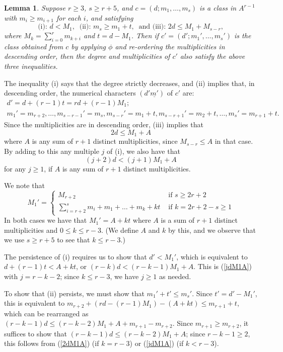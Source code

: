\documentclass[12pt]{article}
\numberwithin{equation}{section}
\newtheorem{lemma}[equation]{Lemma}
\numberwithin{equation}{section}
\numberwithin{subeq}{equation}
\begin{document}
\begin{lemma}
Suppose $r\geq 3$, $s \geq r+5$, and $c = (d;m_1,\ldots,m_s)$ is a class in $A^{r-1}$
with $m_i \geq m_{i+1}$ for each $i$, and satisfying
\[
\text{(i): }d < M_1, \;\; \text{(ii): }m_s \geq m_1+t, \;\;\text{and (iii): } 2d \leq M_1+M_{s-r},
\]
where $M_k = \sum_{i=0}^{r} m_{k+i}$ and $t=d-M_1$.
Then if $c'=(d';m_1',\ldots,m_s')$ is the class obtained from $c$ 
by applying $\phi$ and re-ordering the multiplicities in descending order,
then the degree and multiplicities of $c'$ also satisfy the above three inequalities.
\end{lemma}

\medskip{}
The inequality (i) says that the degree strictly decreases,
and (ii) implies that, in descending order, the numerical characters $(d'\underline{m'})$ of $c'$ are:
\begin{gather*}
d'=d+(r-1)t=rd+(r-1)M_1;\\
m_1'=m_{r+2},\ldots,m_{s-r-1}'=m_s,m_{s-r}'=m_1+t, m_{s-r+1}'=m_2+t,\ldots,m_s'=m_{r+1}+t.
\end{gather*}
Since the multiplicities are in descending order, (iii) implies that
\begin{equation}\label{2dM1A}
2d \leq M_1 + A
\end{equation}
where $A$ is any sum of $r+1$ distinct multiplicities,
since $M_{s-r}\leq A$ in that case.
By adding to this any multiple $j$ of (i), we also have that
\begin{equation}\label{jdM1A}
(j+2)d < (j+1)M_1+A
\end{equation}
for any $j \geq 1$, if $A$ is any sum of $r+1$ distinct multiplicities.

We note that 
\[
M_1' = \begin{cases} M_{r+2} & \text{ if } s \geq 2r+2 \\
\sum_{i=r+2}^s m_i + m_1+\ldots+m_k  + kt & \text{ if } k=2r+2-s \geq 1
\end{cases}
\]
In both cases we have that $M_1'=A+kt$ where
$A$ is a sum of $r+1$ distinct multiplicities and $0 \leq k \leq r-3$.
(We define $A$ and $k$ by this,
and we observe that we use $s \geq r+5$ to see that $k \leq r-3$.)


The persistence of (i) requires us to show that $d'<M_1'$,
which is equivalent to $d+(r-1)t < A+kt$, or $(r-k)d< (r-k-1)M_1+A$.
This is (\ref{jdM1A}) with $j=r-k-2$; since $k \leq r-3$, we have $j\geq 1$ as needed.

To show that (ii) persists, we must show that $m_1'+t' \leq m_s'$.
Since $t'=d'-M_1'$, this is equivalent to
$m_{r+2}+(rd-(r-1)M_1)-(A+kt) \leq m_{r+1}+t$, which can be rearranged as
$(r-k-1)d \leq (r-k-2)M_1 +A+ m_{r+1}-m_{r+2}$.
Since $m_{r+1} \geq m_{r+2}$,
it suffices to show that $(r-k-1)d \leq (r-k-2)M_1 +A$;
since $r-k-1 \geq 2$, this follows from (\ref{2dM1A}) (if $k=r-3$) or (\ref{jdM1A}) (if $k < r-3$).
\end{document}
